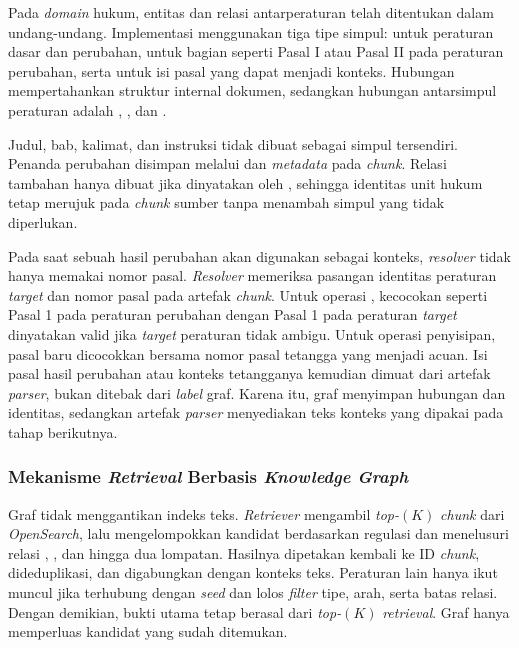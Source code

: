 Pada \emph{domain} hukum, entitas dan relasi antarperaturan telah ditentukan dalam undang-undang.
Implementasi menggunakan tiga tipe simpul:  untuk peraturan dasar dan perubahan,
 untuk bagian seperti Pasal I atau Pasal II pada peraturan perubahan, serta
 untuk isi pasal yang dapat menjadi konteks. Hubungan  mempertahankan struktur
internal dokumen, sedangkan hubungan antarsimpul peraturan adalah , ,
dan .

Judul, bab, kalimat, dan instruksi  tidak dibuat sebagai simpul tersendiri.
Penanda perubahan disimpan melalui  dan \emph{metadata} pada \emph{chunk}.
Relasi tambahan hanya dibuat jika dinyatakan oleh , sehingga identitas unit
hukum tetap merujuk pada \emph{chunk} sumber tanpa menambah simpul yang tidak diperlukan.

Pada saat sebuah  hasil perubahan akan digunakan sebagai konteks, \emph{resolver} tidak
hanya memakai nomor pasal. \emph{Resolver} memeriksa pasangan identitas peraturan \emph{target} dan nomor
pasal pada artefak \emph{chunk}. Untuk operasi , kecocokan seperti Pasal 1 pada
peraturan perubahan dengan Pasal 1 pada peraturan \emph{target} dinyatakan valid jika \emph{target} peraturan
tidak ambigu. Untuk operasi penyisipan, pasal baru dicocokkan bersama nomor pasal tetangga yang
menjadi acuan. Isi pasal hasil perubahan atau konteks tetangganya kemudian dimuat dari artefak
\emph{parser}, bukan ditebak dari \emph{label} graf. Karena itu, graf menyimpan hubungan dan identitas,
sedangkan artefak \emph{parser} menyediakan teks konteks yang dipakai pada tahap berikutnya.

\subsubsection{Mekanisme \emph{Retrieval} Berbasis \emph{Knowledge Graph}}
\label{subsubsec:mekanisme-retrieval-knowledge-graph}

Graf tidak menggantikan indeks teks. \emph{Retriever} mengambil \emph{top-}$(K)$ \emph{chunk}
dari \emph{OpenSearch}, lalu  mengelompokkan kandidat berdasarkan
regulasi dan menelusuri relasi , , dan  hingga dua
lompatan. Hasilnya dipetakan kembali ke ID \emph{chunk}, dideduplikasi, dan digabungkan dengan
konteks teks. Peraturan lain hanya ikut muncul jika terhubung dengan \emph{seed} dan lolos
\emph{filter} tipe, arah, serta batas relasi. Dengan demikian, bukti utama tetap berasal dari
\emph{top-}$(K)$ \emph{retrieval}. Graf hanya memperluas kandidat yang sudah ditemukan.


